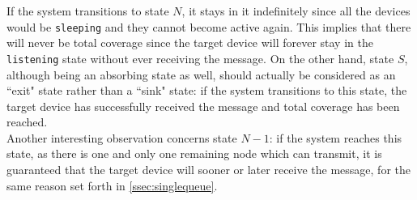 If the system transitions to state $N$, it stays in it indefinitely since all
the devices would be \texttt{sleeping} and they cannot become active again. This
implies that there will never be total coverage since the target device will
forever stay in the \texttt{listening} state without ever receiving the message.
On the other hand, state $S$, although being an absorbing state as well, should
actually be considered as an ``exit" state rather than a ``sink" state: if the
system transitions to this state, the target device has successfully received
the message and total coverage has been reached.\\
Another interesting observation concerns state $N - 1$: if the system reaches
this state, as there is one and only one remaining node which can transmit, it
is guaranteed that the target device will sooner or later receive the message,
for the same reason set forth in \ref{ssec:singlequeue}.
